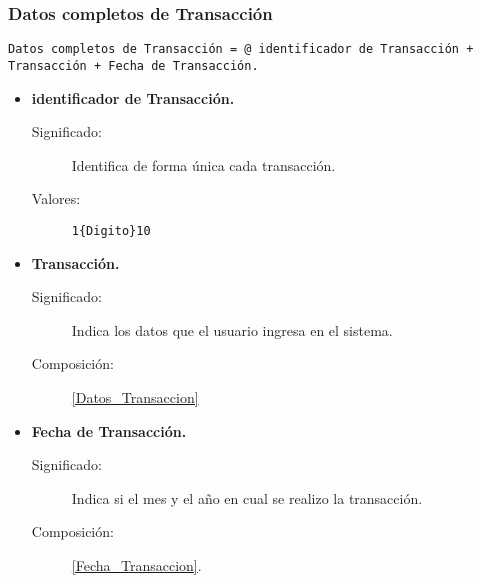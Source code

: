 \subsubsection{Datos completos de Transacción}
\begin{lstlisting}
Datos completos de Transacción = @ identificador de Transacción + Transacción + Fecha de Transacción.
\end{lstlisting}
	\begin{itemize}
		\item \textbf{identificador de Transacción.}\label{IdTransaccion}
			\begin{description}
				\item [Significado:] Identifica de forma única cada transacción.
				\item [Valores:]{\begin{lstlisting}
1{Digito}10\end{lstlisting}}
			\end{description}
		\item \textbf{Transacción.}
			\begin{description}
				\item [Significado:] Indica los datos que el usuario ingresa en el sistema.
				\item [Composición:]\ref{Datos_Transaccion}
			\end{description}
		\item \textbf{Fecha de Transacción.}
			\begin{description}
				\item [Significado:] Indica si el mes y el año en cual se realizo la transacción.
				\item [Composición:] \ref{Fecha_Transaccion}.
			\end{description}
	\end{itemize}


